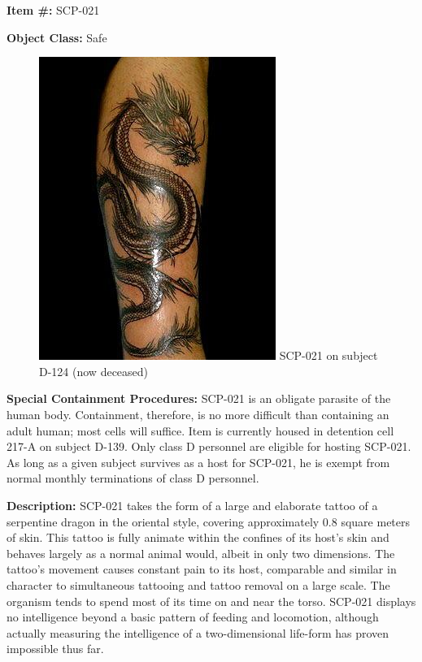 
\textbf{Item \#:} SCP-021

\textbf{Object Class:} Safe

\begin{figure}[h]
\begin{center}
\includegraphics[scale=0.6]{scp/021.jpg}
\linebreak SCP-021 on subject D-124 (now deceased)
\end{center}
\end{figure}

\textbf{Special Containment Procedures:} SCP-021 is an obligate parasite of the human body. Containment, therefore, is no more difficult than containing an adult human; most cells will suffice. Item is currently housed in detention cell 217-A on subject D-139. Only class D personnel are eligible for hosting SCP-021. As long as a given subject survives as a host for SCP-021, he is exempt from normal monthly terminations of class D personnel.

\textbf{Description:} SCP-021 takes the form of a large and elaborate tattoo of a serpentine dragon in the oriental style, covering approximately 0.8 square meters of skin. This tattoo is fully animate within the confines of its host's skin and behaves largely as a normal animal would, albeit in only two dimensions. The tattoo's movement causes constant pain to its host, comparable and similar in character to simultaneous tattooing and tattoo removal on a large scale. The organism tends to spend most of its time on and near the torso. SCP-021 displays no intelligence beyond a basic pattern of feeding and locomotion, although actually measuring the intelligence of a two-dimensional life-form has proven impossible thus far.

